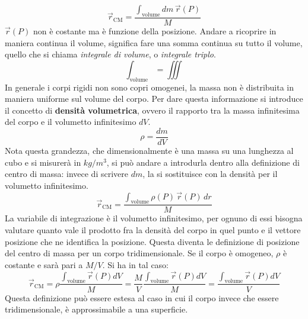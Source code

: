 \documentclass[10pt,a4paper]{book}
\begin{document}
\FloatBarrier
\[
	\vec{r}_\text{CM} = \frac{\int_{\text{volume}} dm\,\vec{r} (P)}{M}
\]
$\vec{r} (P)$ non è costante ma è funzione della posizione. Andare a ricoprire in maniera continua il volume, significa fare una somma continua su tutto il volume, quello che si chiama \emph{integrale di volume}, o \emph{integrale triplo}.
\[
	\int_{\text{volume}} = \iiint
\]
In generale i corpi rigidi non sono copri omogenei, la massa non è distribuita in maniera uniforme sul volume del corpo. Per dare questa informazione si introduce il concetto di \textbf{densità volumetrica}, ovvero il rapporto tra la massa infinitesima del corpo e il volumetto infinitesimo $dV$.
\[
	\rho = \frac{dm}{dV}
\]
Nota questa grandezza, che dimensionalmente è una massa su una lunghezza al cubo e si misurerà in $kg/m^3$, si può andare a introdurla dentro alla definizione di centro di massa: invece di scrivere $dm$, la si sostituisce con la densità per il volumetto infinitesimo.
\[
	\vec{r}_\text{CM} = \frac{\int_{\text{volume}}\rho (P)\, \vec{r} (P)\, dr}{M}
\]
La variabile di integrazione è il volumetto infinitesimo, per ognuno di essi bisogna valutare quanto vale il prodotto fra la densità del corpo in quel punto e il vettore posizione che ne identifica la posizione. Questa diventa le definizione di posizione del centro di massa per un corpo tridimensionale. Se il corpo è omogeneo, $\rho$ è costante e sarà pari a $M/V$. Si ha in tal caso:
\[
	\vec{r}_\text{CM} = \rho \frac{\int_{\text{volume}}\vec{r} (P)dV }{M} = \frac{M}{V} \frac{\int_{\text{volume}}\vec{r} (P)dV }{M} = \frac{\int_{\text{volume}}\vec{r} (P)dV }{V}
\]
Questa definizione può essere estesa al caso in cui il corpo invece che essere tridimensionale, è approssimabile a una superficie.
\end{document}

